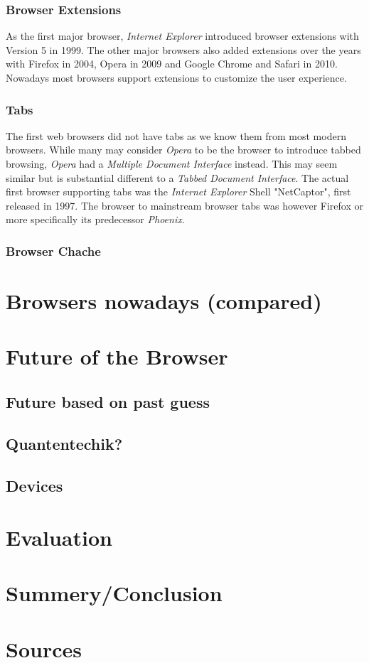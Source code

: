 \documentclass[runningheads]{llncs}
\begin{document}
			\subsubsection{Browser Extensions}
			As the first major browser, \textit{Internet Explorer} introduced browser extensions with Version 5 in 1999. The other major browsers also added extensions over the years with Firefox in 2004, Opera in 2009 and Google Chrome and Safari in 2010. Nowadays most browsers support extensions to customize the user experience.
			\subsubsection{Tabs}
			The first web browsers did not have tabs as we know them from most modern browsers. While many may consider \textit{Opera} to be the browser to introduce tabbed browsing, \textit{Opera} had a  \textit{Multiple Document Interface} instead. This may seem similar but is substantial different to a \textit{Tabbed Document Interface}. The actual first browser supporting tabs was the \textit{Internet Explorer} Shell "NetCaptor", first released in 1997. The browser to mainstream browser tabs was however Firefox or more specifically its predecessor \textit{Phoenix}.
			\subsubsection{Browser Chache}


	\section{Browsers nowadays (compared)}
	\section{Future of the Browser}
		\subsection{Future based on past guess}
		\subsection{Quantentechik?}
		\subsection{Devices}

	\section{Evaluation}

	\section{Summery/Conclusion}
	\section{Sources}
\end{document}
